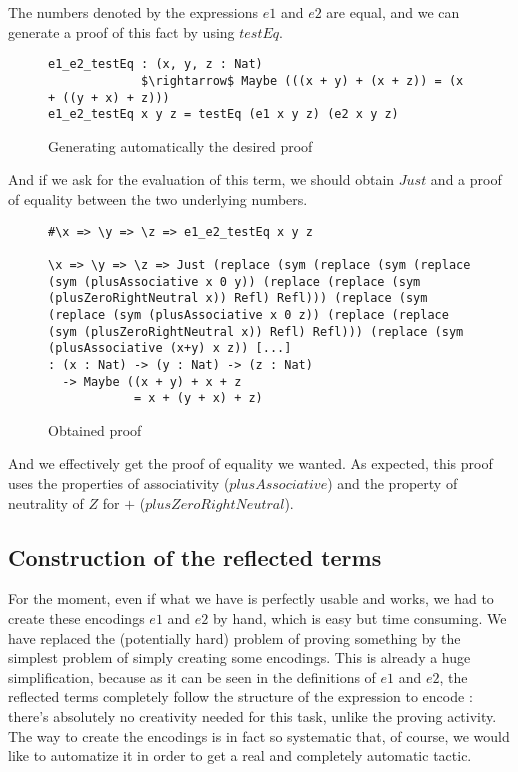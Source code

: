 The numbers denoted by the expressions $e1$ and $e2$ are equal, and we can generate a proof of this fact by using $testEq$.

\begin{figure}[H]
\figrule
\begin{center}
\begin{lstlisting}
e1_e2_testEq : (x, y, z : Nat) 
             $\rightarrow$ Maybe (((x + y) + (x + z)) = (x + ((y + x) + z)))
e1_e2_testEq x y z = testEq (e1 x y z) (e2 x y z)
\end{lstlisting}
\end{center}
\caption{Generating automatically the desired proof}
\label{e1_e2_testEq}
\figrule
\end{figure}


And if we ask for the evaluation of this term, we should obtain $Just$ and a proof of equality between the two underlying numbers.

\begin{figure}[H]
\figrule
\begin{center}
\begin{lstlisting}
#\x => \y => \z => e1_e2_testEq x y z

\x => \y => \z => Just (replace (sym (replace (sym (replace 
(sym (plusAssociative x 0 y)) (replace (replace (sym 
(plusZeroRightNeutral x)) Refl) Refl))) (replace (sym 
(replace (sym (plusAssociative x 0 z)) (replace (replace 
(sym (plusZeroRightNeutral x)) Refl) Refl))) (replace (sym 
(plusAssociative (x+y) x z)) [...]
: (x : Nat) -> (y : Nat) -> (z : Nat) 
  -> Maybe ((x + y) + x + z 
            = x + (y + x) + z)
\end{lstlisting}
\end{center}
\caption{Obtained proof}
\label{obtainedProof}
\figrule
\end{figure}

And we effectively get the proof of equality we wanted. As expected, this proof uses the properties of associativity ($plusAssociative$) and the property of neutrality of $Z$ for $+$ ($plusZeroRightNeutral$).


\subsection{Construction of the reflected terms}
\label{sect:ReflectNat}

For the moment, even if what we have is perfectly usable and works, we had to create these encodings $e1$ and $e2$ by hand, which is easy but time consuming. We have replaced the (potentially hard) problem of proving something by the simplest problem of simply creating some encodings. This is already a huge simplification, because as it can be seen in the definitions of $e1$ and $e2$, the reflected terms completely follow the structure of the expression to encode : there's absolutely no creativity needed for this task, unlike the proving activity. The way to create the encodings is in fact so systematic that, of course, we would like to automatize it in order to get a real and completely automatic tactic.

